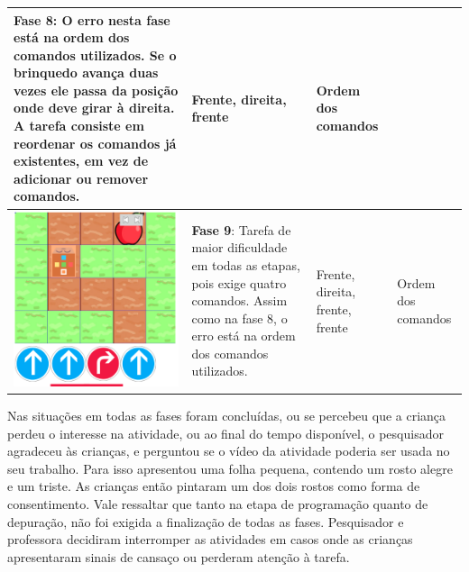 \begin{quadro}[htbp]
\begin{longtable}{ | m{} | m{} | m{} | m{} |}
         \textbf{Fase 8}:
         O erro nesta fase está na ordem dos comandos utilizados. Se o brinquedo avança duas vezes ele passa da posição onde deve girar à direita. A tarefa consiste em reordenar os comandos já existentes, em vez de adicionar ou remover comandos. &
 
         Frente, direita, frente & Ordem dos comandos
         
         \\ \hline
     
     
         \includegraphics[width=.9\linewidth]{figs/debug/4.png} &
     
         \textbf{Fase 9}: 
         Tarefa de maior dificuldade em todas as etapas, pois exige quatro comandos. Assim como na fase 8, o erro está na ordem dos comandos utilizados.
         &
         Frente, direita, frente, frente & Ordem dos comandos
         
         \\ \hline
     

    \end{longtable}
\end{quadro}

Nas situações em todas as fases foram concluídas, ou se percebeu que a criança perdeu o interesse na atividade, ou ao final do tempo disponível, o pesquisador agradeceu às crianças, e perguntou se o vídeo da atividade poderia ser usada no seu trabalho. Para isso apresentou uma folha pequena, contendo um rosto alegre e um triste. As crianças então pintaram um dos dois rostos como forma de consentimento. Vale ressaltar que tanto na etapa de programação quanto de depuração, não foi exigida a finalização de todas as fases. Pesquisador e professora decidiram interromper as atividades em casos onde as crianças apresentaram sinais de cansaço ou perderam atenção à tarefa.

